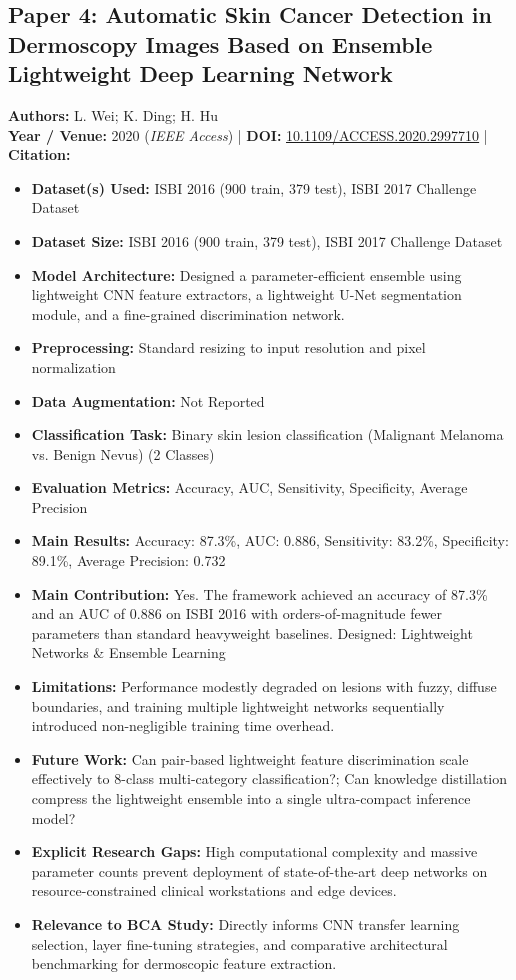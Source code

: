 \documentclass[11pt,a4paper]{article}
\begin{document}
\subsection{Paper 4: Automatic Skin Cancer Detection in Dermoscopy Images Based on Ensemble Lightweight Deep Learning Network}
\textbf{Authors:} L. Wei; K. Ding; H. Hu \\
\textbf{Year / Venue:} 2020 (\textit{IEEE Access}) | \textbf{DOI:} \href{https://doi.org/10.1109/ACCESS.2020.2997710}{10.1109/ACCESS.2020.2997710} | \textbf{Citation:} \cite{9099799}

\begin{itemize}\small
\item \textbf{Dataset(s) Used:} ISBI 2016 (900 train, 379 test), ISBI 2017 Challenge Dataset
\item \textbf{Dataset Size:} ISBI 2016 (900 train, 379 test), ISBI 2017 Challenge Dataset
\item \textbf{Model Architecture:} Designed a parameter-efficient ensemble using lightweight CNN feature extractors, a lightweight U-Net segmentation module, and a fine-grained discrimination network.
\item \textbf{Preprocessing:} Standard resizing to input resolution and pixel normalization
\item \textbf{Data Augmentation:} Not Reported
\item \textbf{Classification Task:} Binary skin lesion classification (Malignant Melanoma vs. Benign Nevus) (2 Classes)
\item \textbf{Evaluation Metrics:} Accuracy, AUC, Sensitivity, Specificity, Average Precision
\item \textbf{Main Results:} Accuracy: 87.3\%, AUC: 0.886, Sensitivity: 83.2\%, Specificity: 89.1\%, Average Precision: 0.732
\item \textbf{Main Contribution:} Yes. The framework achieved an accuracy of 87.3\% and an AUC of 0.886 on ISBI 2016 with orders-of-magnitude fewer parameters than standard heavyweight baselines. Designed: Lightweight Networks \& Ensemble Learning
\item \textbf{Limitations:} Performance modestly degraded on lesions with fuzzy, diffuse boundaries, and training multiple lightweight networks sequentially introduced non-negligible training time overhead.
\item \textbf{Future Work:} Can pair-based lightweight feature discrimination scale effectively to 8-class multi-category classification?; Can knowledge distillation compress the lightweight ensemble into a single ultra-compact inference model?
\item \textbf{Explicit Research Gaps:} High computational complexity and massive parameter counts prevent deployment of state-of-the-art deep networks on resource-constrained clinical workstations and edge devices.
\item \textbf{Relevance to BCA Study:} Directly informs CNN transfer learning selection, layer fine-tuning strategies, and comparative architectural benchmarking for dermoscopic feature extraction.
\end{itemize}
\end{document}
